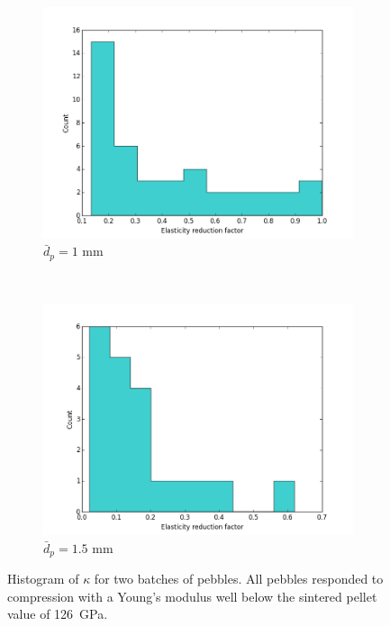 \begin{figure}
        \centering
        \begin{subfigure}[b]{\imagewidth}
                \includegraphics[width=\textwidth]{chapters/figures/nfri-1mm-kappa-histogram.png}
                \caption{$\bar{d}_p = 1$ mm}
                \label{fig:nfri-1mm-kappa-hist}
        \end{subfigure}
        ~
        \begin{subfigure}[b]{\imagewidth}
                \includegraphics[width=\textwidth]{chapters/figures/nfri-1.5mm-kappa-histogram.png}
                \caption{$\bar{d}_p = 1.5$ mm}
                \label{fig:nfri-1.5mm-kappa-hist}
        \end{subfigure}
        \caption{Histogram of $\kappa$ for two batches of \lit pebbles. All pebbles responded to compression with a Young's modulus well below the sintered pellet value of \si{126 GPa}.}\label{fig:nfri-kappa-hist}
\end{figure}


